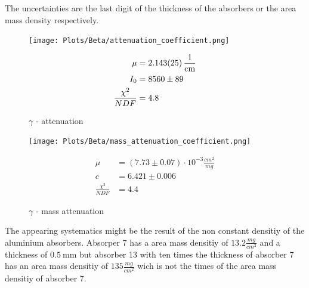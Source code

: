 \documentclass[12pt,twoside,a4paper]{scrartcl}
\begin{document}
        The uncertainties are the last digit of the thickness of the absorbers
        or the area mass density respectively.

        \begin{figure}[H]
					\centering
                \begin{minipage}{0.69 \textwidth}
                    \texttt{[image: Plots/Beta/attenuation\_coefficient.png]}
                \end{minipage}
                \begin{minipage}{0.29 \textwidth}
                    \begin{align*}
                        \mu &= \SI{2.143 \pm 0.025}{\frac{1}{\centi\metre}} \\
                        I_0 &= 8560 \pm 89 \\
                        \frac{\chi^2}{NDF} &= 4.8
                    \end{align*}
                \end{minipage}
                \caption{$\gamma$ - attenuation}
            \end{figure}

        \begin{figure}[H]
					\centering
                \begin{minipage}{0.69 \textwidth}
                    \texttt{[image: Plots/Beta/mass\_attenuation\_coefficient.png]}
                \end{minipage}
                \begin{minipage}{0.29 \textwidth}
                    \begin{align*}
                        \mu &= (7.73 \pm 0.07) \cdot 10^{-3} \frac{cm^2}{mg}\\
                        c &= 6.421 \pm 0.006 \\
                        \frac{\chi^2}{NDF} &= 4.4
                    \end{align*}
                \end{minipage}
                \caption{$\gamma$ - mass attenuation}
            \end{figure}

        The appearing systematics might be the result of the non constant densitiy of
        the aluminium absorbers. Absorper 7 has a area mass densitiy of $13.2 \frac{mg}{cm^2}$
        and a thickness of $\SI{0.5}{\milli \metre}$ but absorber 13 with ten times the thickness
        of absorber 7 has an area mass densitiy of $135 \frac{mg}{cm^2}$ wich is not
        the times of the area mass densitiy of absorber 7.
\end{document}
